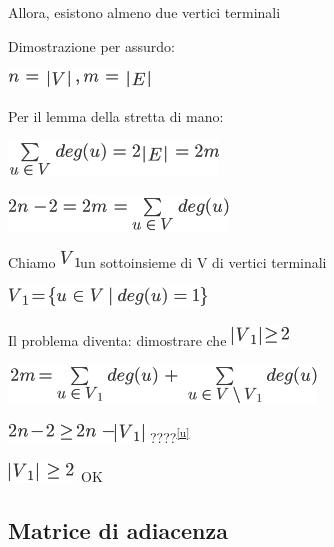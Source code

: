 \documentclass{article}
\begin{document}
{Allora, esistono almeno due vertici terminali}

{}

{Dimostrazione per assurdo:}

\includegraphics{images/image376.png}

{Per il lemma della stretta di mano:}

\includegraphics{images/image377.png}

\includegraphics{images/image378.png}

{Chiamo }\includegraphics{images/image379.png}{un sottoinsieme di V di
vertici terminali}

\includegraphics{images/image380.png}

{Il problema diventa: dimostrare che
}\includegraphics{images/image381.png}

\includegraphics{images/image382.png}

\includegraphics{images/image383.png}{????}\textsuperscript{\protect\hyperlink{cmnt21}{{[}u{]}}}

\includegraphics{images/image384.png}{~OK}

{}

{}

\hypertarget{h.viqjw1dxzez8}{\subsection{\texorpdfstring{{Matrice di
adiacenza }}{Matrice di adiacenza }}\label{h.viqjw1dxzez8}}
\end{document}

